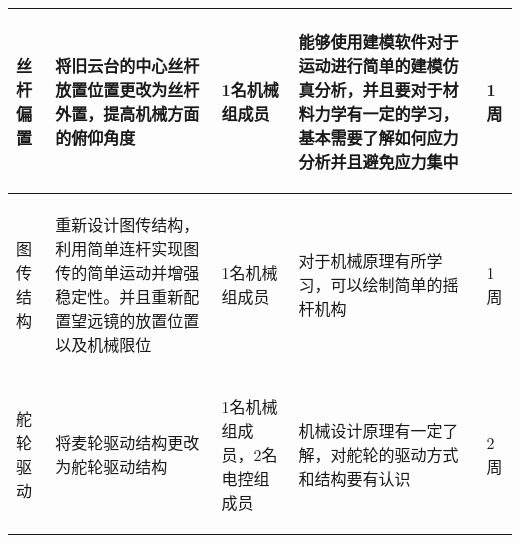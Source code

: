 \begin{longtable}{ p{2cm} | p{3cm} | p{3cm} | p{4.8cm} | p{2cm} |}
    \hline
        \begin{center}
            丝杆偏置
        \end{center} &
        \begin{center}
            将旧云台的中心丝杆放置位置更改为丝杆外置，提高机械方面的俯仰角度
        \end{center} &
        \begin{center}
            1名机械组成员
        \end{center} &
        \begin{center}
            能够使用建模软件对于运动进行简单的建模仿真分析，并且要对于材料力学有一定的学习，基本需要了解如何应力分析并且避免应力集中
        \end{center} &
        \begin{center}
            1周
        \end{center}\\

    \hline
    
        \begin{center}
            图传结构
        \end{center} &
        \begin{center}
            重新设计图传结构，利用简单连杆实现图传的简单运动并增强稳定性。并且重新配置望远镜的放置位置以及机械限位
        \end{center} &
        \begin{center}
            1名机械组成员
        \end{center} &
        \begin{center}
            对于机械原理有所学习，可以绘制简单的摇杆机构
        \end{center} &
        \begin{center}
            1周
        \end{center} \\
        
    \hline
    
        \begin{center}
            舵轮驱动
        \end{center} &
        \begin{center}
            将麦轮驱动结构更改为舵轮驱动结构
        \end{center} &
        \begin{center}
            1名机械组成员，2名电控组成员
        \end{center} &
        \begin{center}
            机械设计原理有一定了解，对舵轮的驱动方式和结构要有认识
        \end{center} &
        \begin{center}
            2周
        \end{center}\\


\end{longtable}
